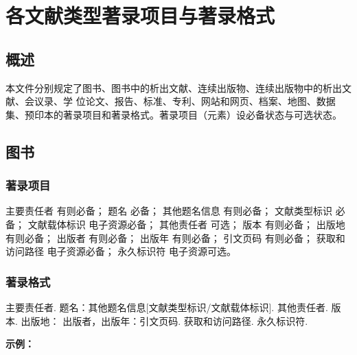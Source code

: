 \documentclass[twoside]{article}%
\begin{document}
\begin{refsection}

\nocite{刘乃安2000-17-18,Deverell2013-21-22,GROSS2016LM}

{\printbibliography[heading=none,env=exampleenv]}
\end{refsection}


\section{各文献类型著录项目与著录格式}
\subsection{概述}

本文件分别规定了图书、图书中的析出文献、连续出版物、连续出版物中的析出文献、会议录、学
位论文、报告、标准、专利、网站和网页、档案、地图、数据集、预印本的著录项目和著录格式。著录项目（元素）设必备状态与可选状态。

\subsection{图书}\label{sec:entrytype:book}

\subsubsection{著录项目}

主要责任者 有则必备；
题名 必备；
其他题名信息 有则必备；
文献类型标识 必备；
文献载体标识 电子资源必备；
其他责任者 可选；
版本 有则必备；
出版地 有则必备；
出版者 有则必备；
出版年 有则必备；
引文页码 有则必备；
获取和访问路径 电子资源必备；
永久标识符 电子资源可选。

\subsubsection{著录格式}

主要责任者. 题名：其他题名信息[文献类型标识/文献载体标识]. 其他责任者. 版本. 出版地：
出版者，出版年：引文页码. 获取和访问路径. 永久标识符.

\begin{refsection}

\nocite{张伯伟2002--,
陈登原2000-29-29,
王夫之1865--,
顾炎武1992--,
1962-50-50,
战德臣2019,
哈里森沃尔德伦2012-235-236,
牛永敢2019,
美国妇产科医师学会2010-38-39,
中国企业投资协会2013--,
赵学功2001--,
中国造纸学会2003--,
PEEBLES2001--,
SADOCK2009,
InstituteForArt2023,
Kinchy2012-50-50,
Praetzellis2011-13-13}

\textbf{示例：}

{\printbibliography[heading=none,env=indentegenv]}
\end{refsection}
\end{document}
